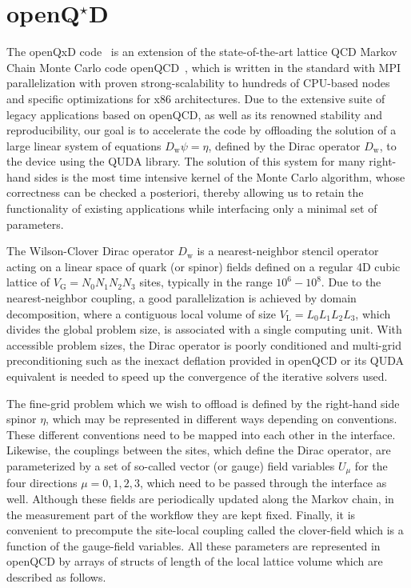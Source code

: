 \chapter{\texorpdfstring{openQ$^\star$D}{openQxD}}
\label{ch:p1:openqxd}


\newcommand{\Dw}{{D_{\mathrm{w}}}}

The openQxD code~\cite{openqxd} is an extension of the state-of-the-art
lattice QCD Markov Chain Monte Carlo code
openQCD~\cite{online:openqcd,Luscher:2012av}, which is written in the  standard
with MPI parallelization with proven strong-scalability to hundreds of
CPU-based nodes and specific optimizations for x86 architectures.
Due to the extensive suite of legacy applications based on openQCD, as well as
its renowned stability and reproducibility, our goal is to accelerate the code
by offloading the solution of a large linear system of equations
$\Dw\psi=\eta$, defined by the Dirac operator $\Dw$, to the
device using the QUDA library.
The solution of this system for many right-hand sides is the most time
intensive kernel of the Monte Carlo algorithm, whose correctness can be
checked a posteriori, thereby allowing us to retain the functionality of
existing applications while interfacing only a minimal set of parameters.

The Wilson-Clover Dirac operator $\Dw$ is a nearest-neighbor stencil operator
acting on a linear space of quark (or spinor) fields defined on a regular 4D
cubic lattice of $V_\mathrm{G}=N_0N_1N_2N_3$ sites, typically in the range $10^6-10^8$.
Due to the nearest-neighbor coupling, a good parallelization is achieved by
domain decomposition, where a contiguous local volume of size $V_\mathrm{L}=L_0L_1L_2L_3$,
which divides the global problem size, is associated with a single computing
unit.
With accessible problem sizes, the Dirac operator is poorly conditioned and
multi-grid preconditioning such as the inexact deflation \cite{Lüscher2007deflation} provided in openQCD
or its QUDA equivalent is needed to speed up the convergence of the iterative
solvers used.

The fine-grid problem which we wish to offload is defined by the right-hand
side spinor $\eta$, which may be represented in different ways depending on 
conventions. These different conventions need to be mapped into each other in the interface.
Likewise, the couplings between the sites, which define the Dirac operator, are
parameterized by a set of so-called vector (or gauge) field variables $U_\mu$
for the four directions $\mu=0,1,2,3$, which need to be passed through the interface as well.
Although these fields are periodically updated along the Markov chain, in
the measurement part of the workflow they are kept fixed.
Finally, it is convenient to precompute the site-local coupling called the
clover-field which is a function of the gauge-field variables.
All these parameters are represented in openQCD by arrays of structs of length of
the local lattice volume which are described as follows.

